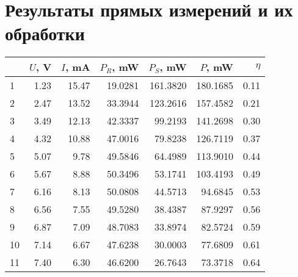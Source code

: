 \section{Результаты прямых измерений и их обработки}
\begin{table}[H]
	\begin{center}
		\begin{tabular}{lrrrrrr}
      \toprule
      \textnumero{} & $U$, \unit{\volt} & $I$, \unit{\milli\ampere} & $P_R$, \unit{\milli\watt} & $P_S$, \unit{\milli\watt} & $P$, \unit{\milli\watt} & $\eta$ \\
      \midrule
			1           & 1.23              & 15.47                     & 19.0281                   & 161.3820                  & 180.1685                & 0.11   \\
			2           & 2.47              & 13.52                     & 33.3944                   & 123.2616                  & 157.4582                & 0.21   \\
			3           & 3.49              & 12.13                     & 42.3337                   & 99.2193                   & 141.2698                & 0.30   \\
			4           & 4.32              & 10.88                     & 47.0016                   & 79.8238                   & 126.7119                & 0.37   \\
			5           & 5.07              & 9.78                      & 49.5846                   & 64.4989                   & 113.9010                & 0.44   \\
			6           & 5.67              & 8.88                      & 50.3496                   & 53.1741                   & 103.4193                & 0.49   \\
			7           & 6.16              & 8.13                      & 50.0808                   & 44.5713                   & 94.6845                 & 0.53   \\
			8           & 6.56              & 7.55                      & 49.5280                   & 38.4387                   & 87.9297                 & 0.56   \\
			9           & 6.87              & 7.09                      & 48.7083                   & 33.8974                   & 82.5724                 & 0.59   \\
			10          & 7.14              & 6.67                      & 47.6238                   & 30.0003                   & 77.6809                 & 0.61   \\
			11          & 7.40              & 6.30                      & 46.6200                   & 26.7643                   & 73.3718                 & 0.64   \\

\end{tabular}
\end{center}
\end{table}
